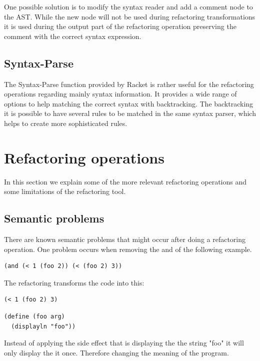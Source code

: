 One possible solution is to modify the syntax reader and add a comment node to the
AST.
While the new node will not be used during refactoring transformations it is used
during the output part of the refactoring operation preserving the comment with
the correct syntax expression.


\subsection{Syntax-Parse}

The Syntax-Parse function provided by Racket is rather useful for the refactoring
operations regarding mainly syntax information.
It provides a wide range of options to help matching the correct syntax with  %
backtracking.
The backtracking it is possible to have several rules to be matched
in the same syntax parser, which helps to create more sophisticated rules.

\section{Refactoring operations}
In this section we explain some of the  more relevant refactoring operations and
some limitations of the refactoring tool.

\subsection{Semantic problems}
There are known semantic problems that might occur after doing a refactoring
operation.
One problem occurs when removing the and of the following example.

\begin{lstlisting}[basicstyle=\ttfamily, caption="And example"]
  (and (< 1 (foo 2)) (< (foo 2) 3))
\end{lstlisting}
The refactoring transforms the code into this:
\begin{lstlisting}[basicstyle=\ttfamily, caption="Example"]
  (< 1 (foo 2) 3)
\end{lstlisting}

\begin{lstlisting}[basicstyle=\ttfamily, caption="Foo"]
(define (foo arg)
  (displayln "foo"))
\end{lstlisting}

Instead of applying the side effect that is displaying the the string "foo"
 it will only display the it once. Therefore changing the meaning of the program.

